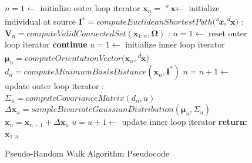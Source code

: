             \begin{figure}[!h]
            \begin{centering}
            \label{euclid}
                \begin{algorithmic}[1]
                
                        \State $n = 1 \gets$ initialize outer loop iterator
                        \State $\textbf{x}_n =$ \textsuperscript{\textit{s}}$\textbf{x} \gets$ initialize individual at source
                        \State \textbf{I}$^{*} = computeEuclideanShortestPath($\textsuperscript{\textit{s}}$\textbf{\textit{x}},$\textsuperscript{\textit{d}}$\textbf{x})$
                        :
                        \State $\textbf{V}_n = computeValidConnectedSet(\textbf{x}_{1:n},\boldsymbol\Omega)$
                        :
                        \State $n = 1 \gets$ reset outer loop iterator
                        \State \textbf{continue}
                        \EndIf
                        \State $u = 1 \gets$ initialize inner loop iterator
                        \State $\boldsymbol{\mu}_n = computeOrientationVector(\textbf{x}_n,$\textsuperscript{\textit{d}}$\textbf{x})$
                        \State $d_n = computeMinimumBasisDistance(\textbf{x}_{n},\textbf{I}^{*})$
                        \State $n = n + 1 \gets$ update outer loop iterator
                        :
                        \State $\Sigma_u = computeCovarianceMatrix(d_n,u)$
                        \State $\Delta\textbf{x}_u = sampleBivariateGaussianDistribution(\boldsymbol\mu_n,\Sigma_u)$
                        \State $\textbf{x}_{n} = \textbf{x}_{n-1} + \Delta\textbf{x}_{u}$
                        \State $u = u + 1 \gets$ update inner loop iterator
                        \EndWhile {}
                        \EndWhile {}
                        \State \textbf{return: $\textbf{x}_{1:n}$}
                        
                \EndProcedure
                \end{algorithmic}   
            \end{centering}
            \caption{Pseudo-Random Walk Algorithm Pseudocode}
            \label{fig:pseudo-random-walk-pseudocode}
            \end{figure}
            
